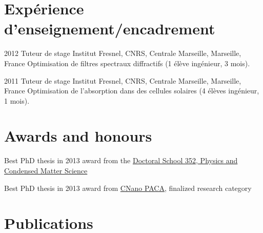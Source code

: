 \documentclass[]{cv} %
\begin{document}
\vspace*{-0.2cm}
\section{Expérience d'enseignement/encadrement}

\begin{entrylist}
\entry
{2012}
{Tuteur de stage}
{{Institut Fresnel}, CNRS, Centrale Marseille, Marseille, France}
{Optimisation de filtres spectraux diffractifs (1 élève ingénieur, 3 mois).}

\entry
{2011}
{Tuteur de stage}
{{Institut Fresnel}, CNRS, Centrale Marseille, Marseille, France}
{Optimisation de l'absorption dans des cellules solaires (4 élèves ingénieur, 1 mois).}


\end{entrylist}

\vspace*{-0.2cm}
\section{Awards and honours}

{Best PhD thesis in 2013 award} from the {\href{http://ed352.sciences.univmed.fr/}{Doctoral School 352, Physics and Condensed Matter Science}}

{Best PhD thesis in 2013 award from {\href{www.cnano-paca.fr/}{CNano PACA}}, finalized research category}

%

 \section{Publications}
%

\end{document}
